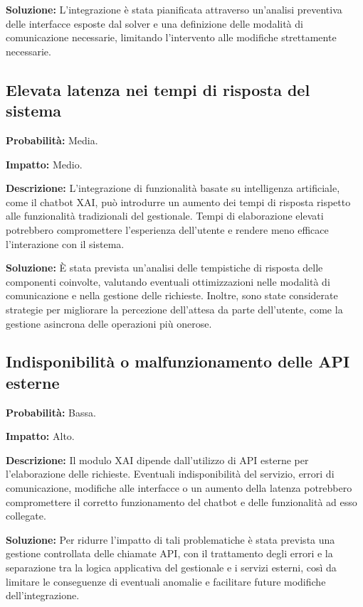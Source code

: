 \textbf{Soluzione:}
L'integrazione è stata pianificata attraverso un'analisi preventiva delle interfacce esposte dal solver e una definizione delle modalità di comunicazione necessarie, 
limitando l'intervento alle modifiche strettamente necessarie.

\subsection{Elevata latenza nei tempi di risposta del sistema}

\textbf{Probabilità:} Media.

\textbf{Impatto:} Medio.

\textbf{Descrizione:}
L'integrazione di funzionalità basate su intelligenza artificiale, come il chatbot XAI, può introdurre un aumento dei tempi di risposta rispetto alle funzionalità 
tradizionali del gestionale. Tempi di elaborazione elevati potrebbero compromettere l'esperienza dell'utente e rendere meno efficace l'interazione con il sistema.

\textbf{Soluzione:}
È stata prevista un'analisi delle tempistiche di risposta delle componenti coinvolte, valutando eventuali ottimizzazioni nelle modalità di comunicazione e nella gestione 
delle richieste. Inoltre, sono state considerate strategie per migliorare la percezione dell'attesa da parte dell'utente, come la gestione asincrona delle operazioni più onerose.

\subsection{Indisponibilità o malfunzionamento delle API esterne}

\textbf{Probabilità:} Bassa.

\textbf{Impatto:} Alto.

\textbf{Descrizione:}
Il modulo XAI dipende dall'utilizzo di API esterne per l'elaborazione delle richieste. Eventuali indisponibilità del servizio, errori di comunicazione, 
modifiche alle interfacce o un aumento della latenza potrebbero compromettere il corretto funzionamento del chatbot e delle funzionalità ad esso collegate.

\textbf{Soluzione:}
Per ridurre l'impatto di tali problematiche è stata prevista una gestione controllata delle chiamate API, con il trattamento degli errori e la separazione tra la logica 
applicativa del gestionale e i servizi esterni, così da limitare le conseguenze di eventuali anomalie e facilitare future modifiche dell'integrazione.
\newpage